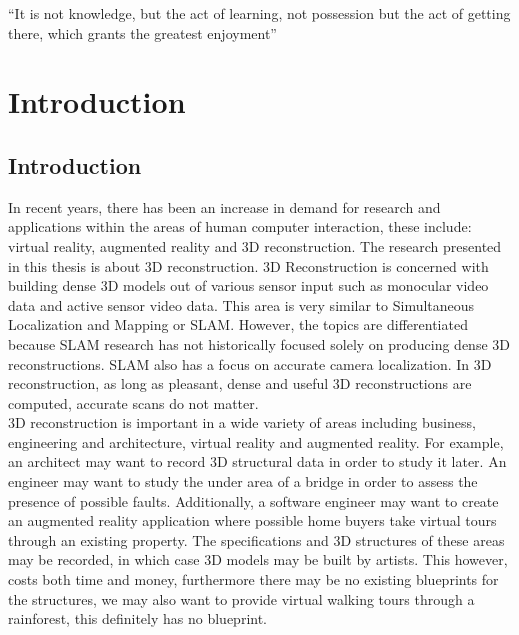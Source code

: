 \begin{savequote}[8cm]
  ``It is not knowledge, but the act of learning, not possession but the act of getting there, which grants the greatest enjoyment''
\end{savequote}
\makeatletter
\chapter{Introduction}



\section{Introduction}

In recent years, there has been an increase in demand for research and applications within the areas of human computer interaction, these include: virtual reality, augmented reality and 3D reconstruction. The research presented in this thesis is about 3D reconstruction. 3D Reconstruction is concerned with building dense 3D models out of various sensor input such as monocular video data and active sensor video data. This area is very similar to Simultaneous Localization and Mapping or SLAM. However, the topics are differentiated because SLAM research has not historically focused solely on producing dense 3D reconstructions. SLAM also has a focus on accurate camera localization. In 3D reconstruction, as long as pleasant, dense and useful 3D reconstructions are computed, accurate scans do not matter. \\

3D reconstruction is important in a wide variety of areas including business, engineering and architecture, virtual reality and augmented reality. For example, an architect may want to record 3D structural data in order to study it later. An engineer may want to study the under area of a bridge in order to assess the presence of possible faults. Additionally, a software engineer may want to create an augmented reality application where possible home buyers take virtual tours through an existing property. The specifications and 3D structures of these areas may be recorded, in which case 3D models may be built by artists. This however, costs both time and money, furthermore there may be no existing blueprints for the structures, we may also want to provide virtual walking tours through a rainforest, this definitely has no blueprint. \\


